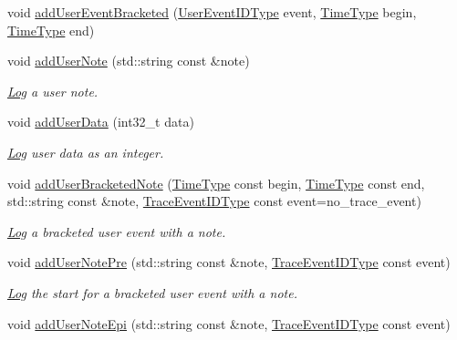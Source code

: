 \begin{DoxyCompactItemize}
void \hyperlink{namespacevt_1_1trace_a2a7cf2ad5c08611bbb348066c7c8ae8f}{add\+User\+Event\+Bracketed} (\hyperlink{namespacevt_1_1trace_a5908920d051c144c89f17c69ed262350}{User\+Event\+I\+D\+Type} event, \hyperlink{namespacevt_a2b9f28078dc309ad0706b69ded743e69}{Time\+Type} begin, \hyperlink{namespacevt_a2b9f28078dc309ad0706b69ded743e69}{Time\+Type} end)
\item 
void \hyperlink{namespacevt_1_1trace_ad679bbbe9a03da579b442dfdba9cef7b}{add\+User\+Note} (std\+::string const  \&note)
\begin{DoxyCompactList}\small\item\em \hyperlink{structvt_1_1trace_1_1_log}{Log} a user note. \end{DoxyCompactList}\item 
void \hyperlink{namespacevt_1_1trace_a0ec1ac44fb179f29245a36b887f588f1}{add\+User\+Data} (int32\+\_\+t data)
\begin{DoxyCompactList}\small\item\em \hyperlink{structvt_1_1trace_1_1_log}{Log} user data as an integer. \end{DoxyCompactList}\item 
void \hyperlink{namespacevt_1_1trace_a2565962cfbadecaf3ccbcef2d933cfc4}{add\+User\+Bracketed\+Note} (\hyperlink{namespacevt_a2b9f28078dc309ad0706b69ded743e69}{Time\+Type} const begin, \hyperlink{namespacevt_a2b9f28078dc309ad0706b69ded743e69}{Time\+Type} const end, std\+::string const  \&note, \hyperlink{namespacevt_1_1trace_a64a7185f3e102df8d8258f263ccd1582}{Trace\+Event\+I\+D\+Type} const event=no\+\_\+trace\+\_\+event)
\begin{DoxyCompactList}\small\item\em \hyperlink{structvt_1_1trace_1_1_log}{Log} a bracketed user event with a note. \end{DoxyCompactList}\item 
void \hyperlink{namespacevt_1_1trace_a4b3d43783121ba2ef4459b9d0ce36e6c}{add\+User\+Note\+Pre} (std\+::string const  \&note, \hyperlink{namespacevt_1_1trace_a64a7185f3e102df8d8258f263ccd1582}{Trace\+Event\+I\+D\+Type} const event)
\begin{DoxyCompactList}\small\item\em \hyperlink{structvt_1_1trace_1_1_log}{Log} the start for a bracketed user event with a note. \end{DoxyCompactList}\item 
void \hyperlink{namespacevt_1_1trace_aa827aafa1d2a9ae4e22fd7494ef2750b}{add\+User\+Note\+Epi} (std\+::string const  \&note, \hyperlink{namespacevt_1_1trace_a64a7185f3e102df8d8258f263ccd1582}{Trace\+Event\+I\+D\+Type} const event)

\end{DoxyCompactItemize}
